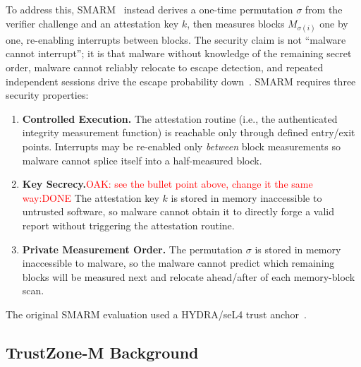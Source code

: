 \documentclass[conference]{IEEEtran}
\newcommand{\smarmcopy}{SMARM-Snap\xspace}
\newcommand{\smarmlock}{SMARM-Guard\xspace}
\newcommand\oak[1]{\textcolor{red}{OAK: #1}}
\begin{document}
To address this, SMARM~\cite{carpent2018smarm} instead derives a one-time permutation $\sigma$ from the verifier challenge and an attestation key $k$, then measures blocks $M_{\sigma(i)}$ one by one, re-enabling interrupts between blocks. 
The security claim is not ``malware cannot interrupt''; it is that malware without knowledge of the remaining secret order, malware cannot reliably relocate to escape detection, and repeated independent sessions drive the escape probability down~\cite{carpent2018smarm}.
SMARM requires three security properties:
\begin{enumerate}
  \item[\textbf{[S1]}] \textbf{Controlled Execution.}
    The attestation routine (i.e., the authenticated integrity measurement function) is reachable only through defined
    entry/exit points. Interrupts may be re-enabled only
    \emph{between} block measurements so malware cannot splice itself into a half-measured block.
  \item[\textbf{[S2]}] \textbf{Key Secrecy.}\oak{see the bullet point above, change it the same way:DONE}
    The attestation key $k$ is stored in memory inaccessible to
    untrusted software, so malware cannot obtain it to directly forge a valid report without triggering the attestation routine.
  \item [\textbf{[S3]}] \textbf{Private Measurement Order.}
    The permutation $\sigma$ is stored in memory inaccessible to malware, so the malware cannot predict which remaining blocks will be measured next and relocate ahead/after of each memory-block scan.
\end{enumerate}
The original SMARM evaluation used a HYDRA/seL4 trust
anchor~\cite{eldefrawy2017hydra,carpent2018smarm}.

\subsection{TrustZone-M Background}
\end{document}
